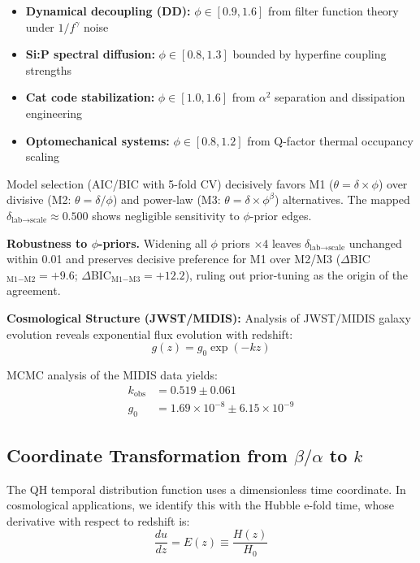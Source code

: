 \documentclass[aps,prd,preprint,onecolumn,nofootinbib,longbibliography]{revtex4-2}
\begin{document}
\begin{itemize}
\item \textbf{Dynamical decoupling (DD):} $\phi \in [0.9, 1.6]$ from filter function theory under $1/f^\gamma$ noise
\item \textbf{Si:P spectral diffusion:} $\phi \in [0.8, 1.3]$ bounded by hyperfine coupling strengths  
\item \textbf{Cat code stabilization:} $\phi \in [1.0, 1.6]$ from $\alpha^2$ separation and dissipation engineering
\item \textbf{Optomechanical systems:} $\phi \in [0.8, 1.2]$ from Q-factor thermal occupancy scaling
\end{itemize}

Model selection (AIC/BIC with 5-fold CV) decisively favors M1 ($\theta = \delta \times \phi$) over divisive (M2: $\theta = \delta/\phi$) and power-law (M3: $\theta = \delta \times \phi^\beta$) alternatives. The mapped $\delta_{\text{lab}\rightarrow\text{scale}} \approx 0.500$ shows negligible sensitivity to $\phi$-prior edges.

\textbf{Robustness to $\phi$-priors.} Widening all $\phi$ priors $\times 4$ leaves $\delta_{\text{lab}\rightarrow\text{scale}}$ unchanged within 0.01 and preserves decisive preference for M1 over M2/M3 ($\Delta$BIC$_{\text{M1}-\text{M2}}=+9.6$; $\Delta$BIC$_{\text{M1}-\text{M3}}=+12.2$), ruling out prior-tuning as the origin of the agreement.

\textbf{Cosmological Structure (JWST/MIDIS):}
Analysis of JWST/MIDIS galaxy evolution reveals exponential flux evolution with redshift:
\begin{equation}
g(z) = g_0 \exp(-kz)
\end{equation}

MCMC analysis of the MIDIS data yields:
\begin{align}
k_{\text{obs}} &= 0.519 \pm 0.061 \\
g_0 &= 1.69 \times 10^{-8} \pm 6.15 \times 10^{-9}
\end{align}

\subsection{Coordinate Transformation from $\beta/\alpha$ to $k$}

The QH temporal distribution function uses a dimensionless time coordinate. In cosmological applications, we identify this with the Hubble e-fold time, whose derivative with respect to redshift is:
\begin{equation}
\frac{du}{dz} = E(z) \equiv \frac{H(z)}{H_0}
\end{equation}
\end{document}
